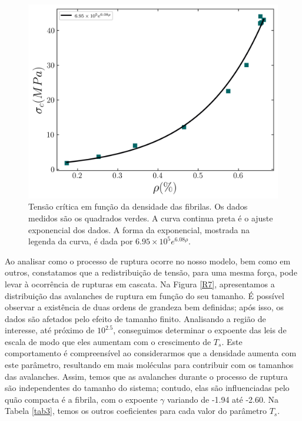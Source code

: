\documentclass{report}
\begin{document}
        \begin{figure}[H]
            \centering
            \includegraphics[width=\textwidth]{figures/sigma_rho.png}

            \caption{Tensão crítica em função da densidade das fibrilas. Os dados medidos são os quadrados verdes. A curva 
            continua preta é o ajuste exponencial dos dados. A forma da exponencial, mostrada na legenda da curva, é dada 
            por \(6.95 \times 10^{5}e^{6.08\rho}\).} 


            \label{R6}
        \end{figure}

        Ao analisar como o processo de ruptura ocorre no nosso modelo, bem como em outros, constatamos que a 
        redistribuição de tensão, para uma mesma força, pode levar à ocorrência de rupturas em cascata. Na Figura 
        \ref{R7}, apresentamos a distribuição das avalanches de ruptura em função do seu tamanho. É possível observar a 
        existência de duas ordens de grandeza bem definidas; após isso, os dados são afetados pelo efeito de tamanho 
        finito. Analisando a região de interesse, até próximo de \(10^{2.5}\), conseguimos determinar o expoente das leis 
        de escala de modo que eles aumentam com o crescimento de \(T_{s}\). Este comportamento é compreensível ao 
        considerarmos que a densidade aumenta com este parâmetro, resultando em mais moléculas para contribuir com os 
        tamanhos das avalanches. Assim, temos que as avalanches durante o processo de ruptura são independentes do tamanho 
        do sistema; contudo, elas são influenciadas pelo quão compacta é a fibrila, com o expoente \(\gamma\) variando de 
        -1.94 até -2.60. Na Tabela \ref{tab3}, temos os outros coeficientes para cada valor do parâmetro \(T_{s}\).
        
\end{document}
